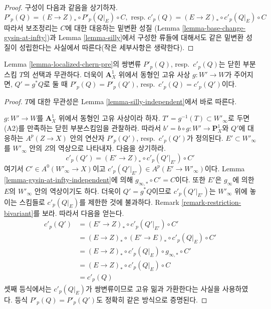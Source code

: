 \begin{proof}
구성이 다음과 같음을 상기하자.
$$
P'_p(Q) = (E \to Z)_* \circ P'_p(Q|_E) \circ C,\text{ resp. }
c'_p(Q) = (E \to Z)_* \circ c'_p(Q|_E) \circ C
$$
따라서 보조정리는 $C$에 대한 대응하는 밑변환 성질
(Lemma \ref{lemma-base-change-gysin-at-infty})과 Lemma
\ref{lemma-silly}에서 구성한 류들에 대해서도 같은 밑변환 성질이
성립한다는 사실에서 따른다(작은 세부사항은 생략한다).
\end{proof}

\begin{lemma}
\label{lemma-localized-chern-pre-independent}
Lemma \ref{lemma-localized-chern-pre}의 쌍변류 $P'_p(Q)$,
resp.\ $c'_p(Q)$는 닫힌 부분스킴 $T$의 선택과 무관하다. 더욱이
$\mathbf{A}^1_X$ 위에서 동형인 고유 사상 $g : W' \to W$가 주어지면,
$Q' = g^*Q$로 둘 때 $P'_p(Q) = P'_p(Q')$,
resp.\ $c'_p(Q) = c'_p(Q')$이다.
\end{lemma}

\begin{proof}
$T$에 대한 무관성은 Lemma \ref{lemma-silly-independent}에서 바로 따른다.

\medskip\noindent
$g : W' \to W$를 $\mathbf{A}^1_X$ 위에서 동형인 고유 사상이라 하자.
$T' = g^{-1}(T) \subset W'_\infty$로 두면 (A2)를 만족하는 닫힌
부분스킴임을 관찰하라. 따라서 $b' = b \circ g : W' \to \mathbf{P}^1_X$와
$Q'$에 대응하는 $A^p(Z \to X)$ 안의 연산자 $P'_p(Q')$,
resp.\ $c'_p(Q')$가 정의된다. $E' \subset W'_\infty$를 $W'_\infty$ 안의
$Z$의 역상으로 나타내자. 다음을 상기하라.
$$
c'_p(Q') = (E' \to Z)_* \circ c'_p(Q'|_{E'}) \circ C'
$$
여기서 $C' \in A^0(W'_\infty \to X)$이고
$c'_p(Q'|_{E'}) \in A^p(E' \to W'_\infty)$이다. Lemma
\ref{lemma-gysin-at-infty-independent}에 의해
$g_{\infty, *} \circ C' = C$이다. 또한 $E'$은 $g_\infty$에 의한
$E$의 $W'_\infty$ 안의 역상이기도 하다. 더욱이 $Q' = g^*Q$이므로
$c'_p(Q'|_{E'})$는 $W'_\infty$ 위에 놓이는 스킴들로 $c'_p(Q|_E)$를
제한한 것에 불과하다. Remark \ref{remark-restriction-bivariant}를 보라.
따라서 다음을 얻는다.
\begin{align*}
c'_p(Q')
& = 
(E' \to Z)_* \circ c'_p(Q'|_{E'}) \circ C' \\
& =
(E \to Z)_* \circ (E' \to E)_* \circ c'_p(Q|_E) \circ C' \\
& =
(E \to Z)_* \circ c'_p(Q|_E) \circ g_{\infty, *} \circ C' \\
& =
(E \to Z)_* \circ c'_p(Q|_E) \circ C \\
& =
c'_p(Q)
\end{align*}
셋째 등식에서는 $c'_p(Q|_E)$가 쌍변류이므로 고유 밂과 가환한다는
사실을 사용하였다. 등식 $P'_p(Q) = P'_p(Q')$도 정확히 같은 방식으로
증명된다.
\end{proof}

